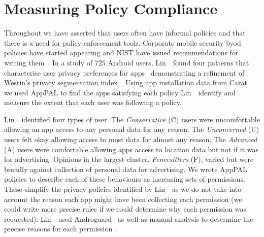 \documentclass[]{llncs}
\begin{document}
\section{Measuring Policy Compliance}
\label{sec:demonstation}

Throughout we have asserted that users often have informal policies and that there is a need for policy enforcement tools.
Corporate mobile security \ac{byod} policies have started appearing and NIST have issued recommendations for writing them~\cite{Scarfone:2009vy,Souppaya:2013jf}.
In a study of 725 Android users, Lin~\etal~found four patterns that characterise user privacy preferences for apps~\cite{Sadeh:2014vq} demonstrating a refinement of Westin's privacy segmentation index~\cite{Krane:2002jo}.
Using app installation data from Carat~\cite{Oliner:2013ht,Chia:2012gz} we used AppPAL to find the apps satisfying each policy Lin~\etal~identify and measure the extent that each user was following a policy.

Lin~\etal~identified four types of user.
The \emph{Conservative} (C) users were uncomfortable allowing an app access to any personal data for any reason.
The \emph{Unconcerned} (U) users felt okay allowing access to most data for almost any reason.
The \emph{Advanced} (A) users were comfortable allowing apps access to location data but not if it was for advertising.
Opinions in the largest cluster, \emph{Fencesitters} (F), varied but were broadly against collection of personal data for advertising.
We wrote AppPAL policies to describe each of these behaviours as increasing sets of permissions.
These simplify the privacy policies identified by Lin~\etal~as we do not take into account the reason each app might have been collecting each permission
(we could write more precise rules if we could determine why each permission was requested).
Lin~\etal~used Androguard~\cite{Desnos:ub} as well as manual analysis to determine the precise reasons for each permission~\cite{Sadeh:2014vq}.
\end{document}
